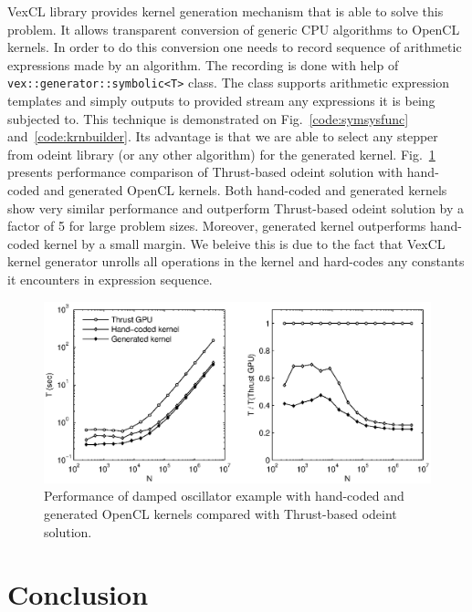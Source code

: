 \documentclass[1p]{elsarticle}
\newcommand{\code}[1]{\lstinline|#1|}
\newcommand{\figref}[1]{Fig.~\ref{#1}}
\begin{document}
VexCL library provides kernel generation mechanism that is able to solve this
problem. It allows transparent conversion of generic CPU algorithms to OpenCL
kernels. In order to do this conversion one needs to record sequence of
arithmetic expressions made by an algorithm.  The recording is done with help
of \code{vex::generator::symbolic<T>} class. The class supports arithmetic
expression templates and simply outputs to provided stream any expressions it
is being subjected to. This technique is demonstrated on
\figref{code:symsysfunc} and~\ref{code:krnbuilder}. Its advantage is
that we are able to select any stepper from odeint library (or any other
algorithm) for the generated kernel. \figref{fig:genkernel} presents
performance comparison of Thrust-based odeint solution with hand-coded and
generated OpenCL kernels. Both hand-coded and generated kernels show very
similar performance and outperform Thrust-based odeint solution by a factor of
5 for large problem sizes. Moreover, generated kernel outperforms hand-coded
kernel by a small margin. We beleive this is due to the fact that VexCL kernel
generator unrolls all operations in the kernel and hard-codes any constants it
encounters in expression sequence.

\begin{figure}
    \begin{center}
	\includegraphics[width=\textwidth]{data/damped_oscillator/genkernel}
    \end{center}
    \caption{Performance of damped oscillator example with hand-coded and
    generated OpenCL kernels compared with Thrust-based odeint solution.}
    \label{fig:genkernel}
\end{figure}

\section{Conclusion}
\end{document}
